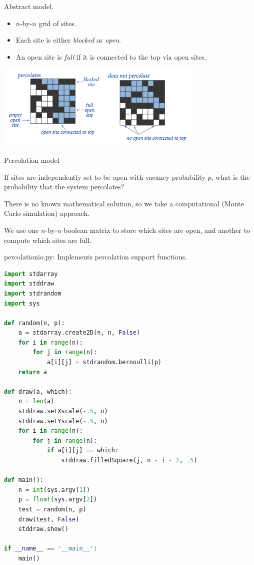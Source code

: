 \documentclass[8pt,a4paper,compress,handout]{beamer}
\begin{document}
\begin{frame}[fragile]
Abstract model.
\begin{itemize}
\item $n$-by-$n$ grid of sites.
\item Each site is either \emph{blocked} or \emph{open}.
\item An open site is \emph{full} if it is connected to the top via open sites.
\end{itemize}

\begin{center}
\includegraphics[scale=0.4]{figures/percolation1.png}

\smallskip

\tiny Percolation model
\end{center}

\bigskip

If sites are independently set to be open with vacancy probability $p$, what is the probability that the system percolates?

\bigskip

There is no known mathematical solution, so we take a computational (Monte Carlo simulation) approach.

\bigskip

We use one $n$-by-$n$ boolean matrix to store which sites are open, and another to compute which sites are full. 
\end{frame}

\begin{frame}[fragile]
\begin{framed}
\tiny percolationio.py: Implements percolation support functions.
\end{framed}

\begin{lstlisting}[language=Python]
import stdarray
import stddraw
import stdrandom
import sys

def random(n, p):
    a = stdarray.create2D(n, n, False)
    for i in range(n):
        for j in range(n):
            a[i][j] = stdrandom.bernoulli(p)
    return a

def draw(a, which):
    n = len(a)
    stddraw.setXscale(-.5, n)
    stddraw.setYscale(-.5, n)
    for i in range(n):
        for j in range(n):
            if a[i][j] == which:
                stddraw.filledSquare(j, n - i - 1, .5)

def main():
    n = int(sys.argv[1])
    p = float(sys.argv[2])
    test = random(n, p)
    draw(test, False)
    stddraw.show()
    
if __name__ == '__main__':
    main()
\end{lstlisting}
\end{frame}
\end{document}

